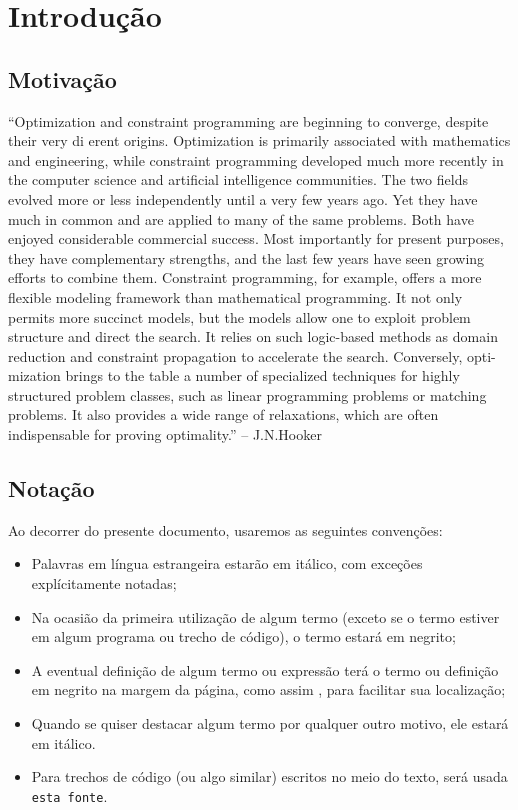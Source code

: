 
%



%
%
%


%

\section*{Introdução}

\subsection*{Motivação}

``Optimization and constraint programming are beginning to converge,  despite  their very
di erent origins.  Optimization is primarily associated with mathematics and engineering,
while constraint programming developed much more recently in the computer science and
artificial intelligence communities.  The two  fields evolved more or less independently until
a very few years ago.   Yet they have much in common and are applied to many of the
same problems.  Both have enjoyed considerable commercial success.  Most importantly for
present purposes,  they have complementary  strengths,  and the last few years have  seen
growing efforts to combine them.
Constraint programming, for example, offers a more flexible modeling framework than
mathematical programming. It not only permits more succinct models, but the models allow
one to exploit problem structure and direct the search. It relies on such logic-based methods
as domain reduction and constraint propagation to accelerate the search.  Conversely, opti-
mization brings to the table a number of specialized techniques for highly structured problem
classes, such as linear programming problems or matching problems. It also provides a wide
range of relaxations, which are often indispensable for proving optimality.'' -- J.N.Hooker

\subsection*{Notação}
  Ao decorrer do presente documento, usaremos as seguintes convenções:

  \begin{itemize}
    \item Palavras em língua estrangeira estarão em itálico, com exceções explícitamente notadas;
    \item Na ocasião da primeira utilização de algum termo (exceto se o termo estiver em algum programa ou trecho de código), o termo estará em negrito;
    \item A eventual definição de algum termo ou expressão terá o termo ou definição em negrito na
      margem da página, como assim , para facilitar sua localização;
    \item Quando se quiser destacar algum termo por qualquer outro motivo, ele estará em itálico.
    \item Para trechos de código (ou algo similar) escritos no meio do texto, será usada {\tt esta fonte}.
  \end{itemize}

